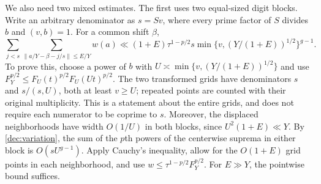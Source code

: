 \documentclass[11pt,a4paper]{article}
\theoremstyle{paperplain}
\numberwithin{equation}{section}
\begin{document}
We also need two mixed estimates. The first uses two equal-sized digit
blocks. Write an arbitrary denominator as $s=S v$, where every prime
factor of $S$ divides $b$ and $(v,b)=1$. For a common shift $\beta$,
\begin{equation}\label{dec:adaptiverow}
 \sum_{j<s}\sum_{\|a/Y-\beta-j/s\|\le E/Y}w(a)
 \ll (1+E)\tau^{1-p/2}s
 \min\{v,(Y/(1+E))^{1/2}\}^{g-1}.
\end{equation}
To prove this, choose a power of $b$ with
$U\asymp\min\{v,(Y/(1+E))^{1/2}\}$ and use
$F_Y^{p/2}\le F_U(t)^{p/2}F_U(Ut)^{p/2}$.
The two transformed grids have denominators $s$ and
$s/(s,U)$, both at least $v\ge U$; repeated points are counted with
their original multiplicity. This is a statement about the entire
grids, and does not require each numerator to be coprime to $s$.
Moreover, the displaced neighborhoods have width $O(1/U)$ in both
blocks, since $U^2(1+E)\ll Y$.
By \eqref{dec:variation}, the sum of the $p$th powers of the
centerwise suprema in either block is $O(sU^{g-1})$.
Apply Cauchy's inequality, allow for the $O(1+E)$ grid points in each
neighborhood, and use $w\le\tau^{1-p/2}F_Y^{p/2}$.
For $E\gg Y$, the pointwise bound suffices.
\end{document}
